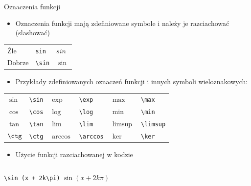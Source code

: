 \documentclass{beamer}
\theoremstyle{newblock}
\begin{document}
\begin{frame}[fragile]{Oznaczenia funkcji}

\begin{itemize}
    \item Oznaczenia funkcji mają zdefiniowane symbole i należy je razciachować (slashować)
\end{itemize}

    


\begin{table}[0.8\linewidth]
    \centering
    \begin{tabular}{l l l}
        \alert{Źle} & \verb|sin| &  $sin$\\
         Dobrze & \verb|\sin| & $\sin$ 
    \end{tabular}
\end{table}
\pause
\begin{itemize}
    \item Przykłady zdefiniowanych oznaczeń funkcji i innych symboli wieloznakowych:
\end{itemize}
\begin{table}[]
    \centering
    \begin{tabular}{l l l l l l}
       $\sin$ & \verb|\sin| &  $\exp$ & \verb|\exp|& $\max$ & \verb|\max|\\
       $\cos$  & \verb|\cos|&  $\log$ & \verb|\log|& $\min$ & \verb|\min|\\
       $\tan$  & \verb|\tan|&  $\lim$ & \verb|\lim|& $\limsup$ & \verb|\limsup|\\
       $\ctg$  & \verb|\ctg|&  $\arccos$ & \verb|\arccos|& $\ker$ & \verb|\ker|\\
    \end{tabular}
    \label{tab:funkcje_razciachowane}
\end{table}
\pause
\begin{itemize}
    \item Użycie funkcji razciachowanej w kodzie
\end{itemize}

\begin{columns}

        \centering
        \verb|\sin (x + 2k\pi)|
    $\sin( x + 2k \pi )$ 

\end{columns}
    
\end{frame}
\end{document}
